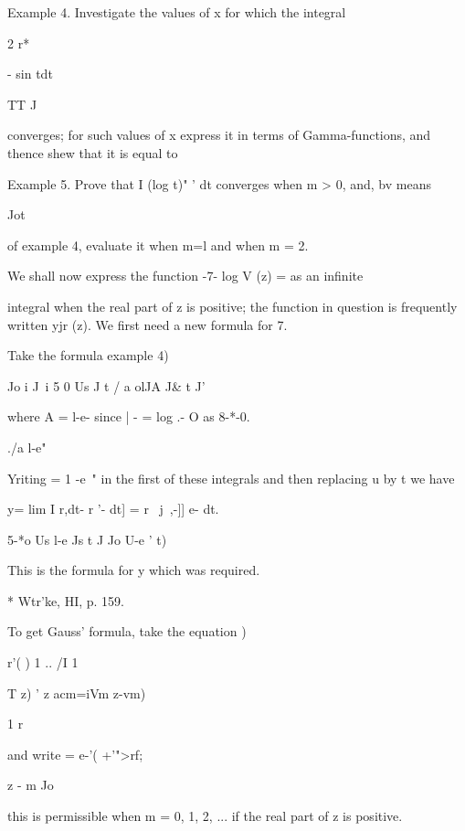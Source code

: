 
Example 4. Investigate the values of x for which the integral

2 r*

 - sin tdt

TT J

converges; for such values of x express it in terms of
Gamma-functions, and thence shew that it is equal to


Example 5. Prove that I (log t)" ' dt converges when m > 0, and, bv
means

Jot

of example 4, evaluate it when m=l and when m = 2.


We shall now express the function -7- log V (z) = as an infinite

integral when the real part of z is positive; the function in
question is frequently written yjr (z). We first need a new formula
for 7.

Take the formula  example 4)

  Jo i J\ i 5 0 Us J t / a olJA J\& t J'

where A = l-e- since | - = log .- O as 8-*-0.

./a l-e"

 Yriting = 1 -e~" in the first of these integrals and then replacing u
by t we have

y= lim I r,dt- r '- dt] = r \ j~,-]] e- dt.

5-*o Us l-e Js t J Jo U-e ' t)

This is the formula for y which was required.

* Wtr'ke, HI, p. 159.

%
%

To get Gauss' formula, take the equation )

r'( ) 1 .. /I 1 \

T z) ' z acm=iVm z-vm)

1 r

and write = e-'( +'">rf;

z - m Jo

this is permissible when m = 0, 1, 2, ... if the real part of z is
positive.

